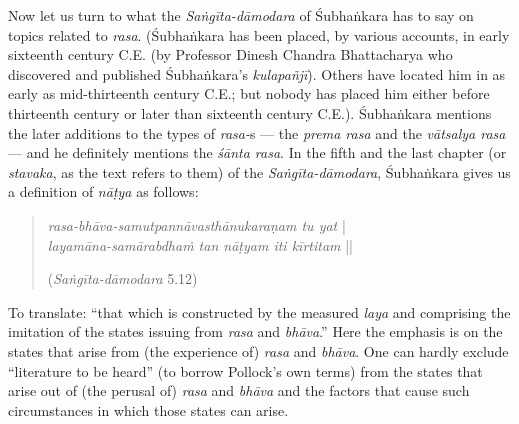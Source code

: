 Now let us turn to what the \textsl{Saṅgīta-dāmodara} of Śubhaṅkara has to say on topics related to \textsl{rasa}. (Śubhaṅkara has been placed, by various accounts, in early sixteenth century C.E. (by Professor Dinesh Chandra Bhattacharya who discovered and published Śubhaṅkara’s \textsl{kulapañjī}). Others have located him in as early as mid-thirteenth century C.E.; but nobody has placed him either before thirteenth century or later than sixteenth century C.E.). Śubhaṅkara mentions the later additions to the types of \textsl{rasa-}s --- the \textsl{prema rasa} and the \textsl{vātsalya rasa} --- and he definitely mentions the \textsl{śānta rasa}. In the fifth and the last chapter (or \textsl{stavaka}, as the text refers to them) of the \textsl{Saṅgīta-dāmodara}, Śubhaṅkara gives us a definition of \textsl{nāṭya} as follows:
\begin{quote}
\textsl{rasa-bhāva-samutpannāvasthānukaraṇam tu yat} |\\
\textsl{layamāna-samārabdhaṁ tan nāṭyam iti kīrtitam} || 

\hfill (\textsl{Saṅgīta-dāmodara} 5.12) 
\end{quote}

To translate: “that which is constructed by the measured \textsl{laya} and comprising the imitation of the states issuing from \textsl{rasa} and \textsl{bhāva}.” Here the emphasis is on the states that arise from (the experience of) \textsl{rasa} and \textsl{bhāva}. One can hardly exclude “literature to be heard” (to borrow Pollock’s own terms) from the states that arise out of (the perusal of) \textsl{rasa} and \textsl{bhāva} and the factors that cause such circumstances in which those states can arise. 

